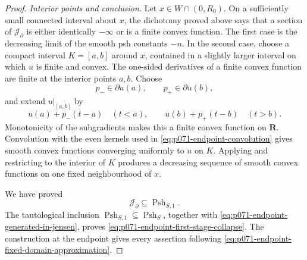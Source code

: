 \begin{proof}
\medskip\noindent\emph{Interior points and conclusion.}
Let \(x\in W\cap(0,R_0)\).  On a sufficiently small connected interval
about \(x\), the dichotomy proved above says that a section of
\(\mathscr J_{\partial}\) is either identically \(-\infty\) or is a
finite convex function.  The first case is the decreasing limit of the
smooth psh constants \(-n\).  In the second case, choose a compact
interval \(K=[a,b]\) around \(x\), contained in a slightly larger interval
on which \(u\) is finite and convex.  The one-sided derivatives of a finite
convex function are finite at the interior points \(a,b\).  Choose
\[
                    p_-\in\partial u(a),
                    \qquad p_+\in\partial u(b),
\]
and extend \(u|_{[a,b]}\) by
\[
 u(a)+p_-(t-a)\quad(t<a),
 \qquad
 u(b)+p_+(t-b)\quad(t>b).
\]
Monotonicity of the subgradients makes this a finite convex function on
\(\mathbf R\).  Convolution with the even kernels used in
\eqref{eq:p071-endpoint-convolution} gives smooth convex functions
converging uniformly to \(u\) on \(K\).  Applying
\cite[Lemma~8.1.10]{CLD25} and restricting to the interior of \(K\)
produces a decreasing sequence of smooth convex functions on one fixed
neighbourhood of \(x\).

We have proved
\[
                 \mathscr J_{\partial}
                 \subseteq\operatorname{Psh}_{S,1}.
\]
The tautological inclusion
\(\operatorname{Psh}_{S,1}\subseteq\operatorname{Psh}_S\), together with
\eqref{eq:p071-endpoint-generated-in-jensen}, proves
\eqref{eq:p071-endpoint-first-stage-collapse}.  The construction at the
endpoint gives every assertion following
\eqref{eq:p071-endpoint-fixed-domain-approximation}.
\end{proof}

